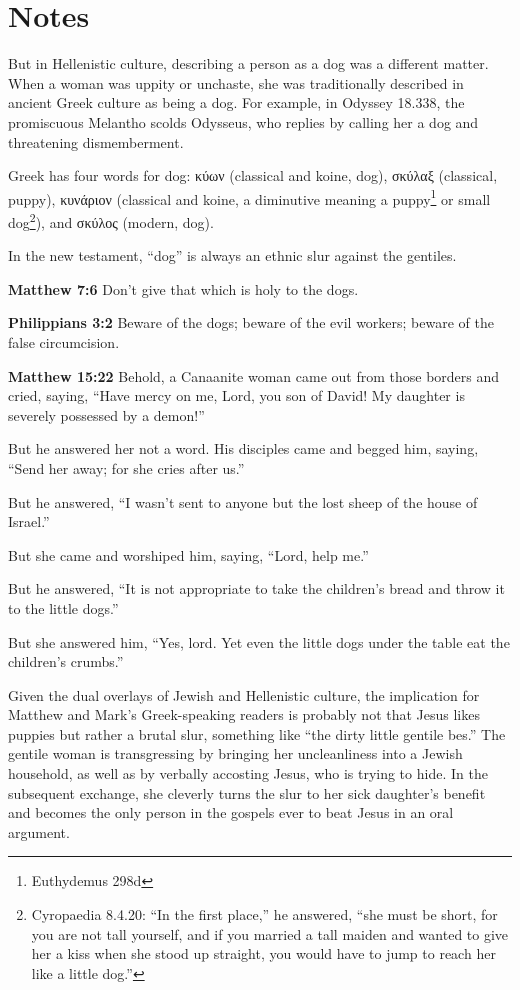 \documentclass[10pt,a5paper,twoside]{article}
\newcommand{\quotesize}{\normalsize{}}
\newcommand{\maintextquotesize}{\renewcommand{\quotesize}{\large{}}}
\newcommand{\notequotesize}{\renewcommand{\quotesize}{\normalsize{}}}
\newenvironment{quotetext}{\begingroup\quotesize}{\endgroup}
\newcommand{\intex}[1]{\index[texts]{#1}}
\newcommand{\bible}[2]{\begin{quotetext}\textbf{#1}\intex{#1} #2\end{quotetext}}
\newcommand{\matthew}[2]{\bible{Matthew #1}{#2}}
\newenvironment{notesection}[1]{
  \setcounter{secnumdepth}{0}          %
  \section*{#1}
  \setcounter{secnumdepth}{2}          %
  \notequotesize
}%
{
  \maintextquotesize
}
\begin{document}
\begin{notesection}{Notes}
But in Hellenistic culture, describing a person as a dog was a different matter. When a woman was uppity or unchaste,
she was traditionally described in ancient Greek culture as being a dog. For example, in Odyssey 18.338,
the promiscuous Melantho scolds Odysseus, who replies by calling her a dog and threatening dismemberment.

Greek has four words for dog: κύων (classical and koine, dog), σκύλαξ (classical, puppy),
κυνάριον (classical and koine, a diminutive meaning a puppy\footnote{Euthydemus 298d} or
small dog\footnote{Cyropaedia 8.4.20: ``In the first place,'' he answered, ``she must be short, for you are not tall yourself, and if you married a tall maiden and wanted to give her a kiss when she stood up straight, you would have to jump to reach her like a little dog.''}), and σκύλος (modern, dog).

In the new testament, ``dog'' is always an ethnic slur against the gentiles.

\matthew{7:6}{
Don't give that which is holy to the dogs.
}

\bible{Philippians 3:2}{
Beware of the dogs; beware of the evil workers; beware of the false circumcision.
}

\matthew{15:22}{
Behold, a Canaanite woman came out from those borders and cried, saying, ``Have mercy on me, Lord, you son of David! My daughter is severely possessed by a demon!''

 But he answered her not a word.
His disciples came and begged him, saying, ``Send her away; for she cries after us.''

 But he answered, ``I wasn't sent to anyone but the lost sheep of the house of Israel.''

 But she came and worshiped him, saying, ``Lord, help me.''

 But he answered, ``It is not appropriate to take the children's bread and throw it to the little dogs.'' 

  But she answered him, ``Yes, lord. Yet even the little dogs under the table eat the children's crumbs.''
}


Given the dual overlays of Jewish and Hellenistic culture,
the implication for Matthew and Mark's Greek-speaking readers is probably not that Jesus likes puppies but rather
 a brutal slur, something like ``the dirty little gentile b\textendash\textendash\textendash\textendash{}es.''
The gentile woman is transgressing by bringing her uncleanliness into a Jewish household, as well as by
verbally accosting Jesus, who is trying to hide. In the subsequent exchange, she cleverly turns the slur to her sick daughter's benefit
and becomes the only person in the gospels ever to beat Jesus in an oral argument.



\end{notesection}
\end{document}
